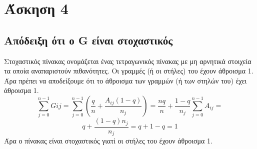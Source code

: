 \documentclass[a4paper,11pt]{article}
\newcommand{\lt}{\latintext}
\newcommand{\gt}{\greektext}
\begin{document}
\section{Άσκηση 4}
	\subsection{Απόδειξη ότι ο \lt G \gt είναι στοχαστικός}
\normalsize{Στοχαστικός πίνακας ονομάζεται ένας τετραγωνικός
πίνακας με μη αρνητικά στοιχεία τα οποία αναπαριστούν πιθανότητες.
Οι γραμμές (ή οι στήλες) του έχουν άθροισμα 1. Άρα πρέπει να
αποδείξουμε ότι το άθροισμα των γραμμών (ή των στηλών του) έχει
άθροισμα 1.}
\\
\begin{equation*}
\sum_{j = 0}^{n-1}Gij = \sum_{j = 0}^{n-1} (\frac{q}{n} +
\frac{A_{ij}(1-q)}{n_j})
= \frac{nq}{n} + \frac{1-q}{n_j}\sum_{j = 0}^{n-1}A_{ij} =
\end{equation*}
\begin{equation*}
q + \frac{(1-q)n_j}{n_j} = q + 1 -q = 1
\end{equation*}
\normalsize{Άρα ο πίνακας είναι στοχαστικός γιατί οι στήλες του έχουν
άθροισμα 1.}
\end{document}
